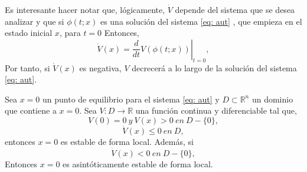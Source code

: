 Es interesante hacer notar que, lógicamente, $\dot V$ depende del sistema que se desea analizar y que si $\phi(t;x)$ es una solución del sistema \ref{eq: aut} , que empieza  en el estado inicial $x$, para $t=0$ Entonces,
\begin{equation}
\dot V(x) =\left. \frac{d}{dt}V(\phi (t;x))\right|_{t=0},
\end{equation}
Por tanto, si $\dot V(x)$ es negativa, $V$ decrecerá a lo largo de la solución del sistema \ref{eq: aut}.

\begin{theorem}\label{thm: lyap1}
Sea $x=0$ un punto de equilibrio para el sistema \ref{eq: aut} y $D \subset \mathbb{R}^n$ un dominio que contiene a $x=0$. Sea $V:D 	\to \mathbb{R}$ una función continua y diferenciable tal que,
\begin{equation}\label{eq: lyap1}
V(0) = 0\ y\ V(x) > 0\ en\  D-\{0\},
\end{equation}
\begin{equation}\label{eq: lyap2}
\dot V(x) \leq 0\ en\ D,
\end{equation} 
entonces $x=0$ es estable de forma local. Además, si
\begin{equation}\label{eq: lyap3}
\dot V(x) < 0 \ en\ D-\{0\},
\end{equation} 
Entonces $x=0$ es asintóticamente estable de forma local.
\end{theorem}
